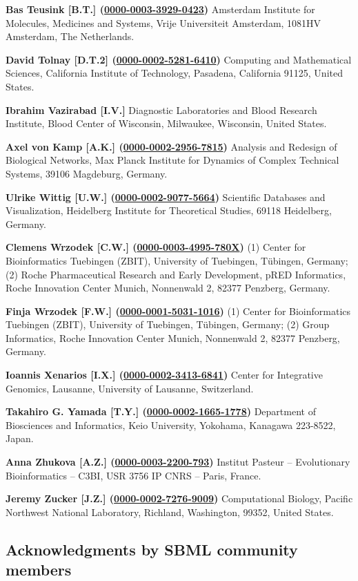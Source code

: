 \documentclass{sbml-paper}
\newcommand{\orcid}[1]{\href{https://orcid.org/#1}{#1}}
\begin{document}
\textbf{Bas Teusink [B.T.] (\orcid{0000-0003-3929-0423})} Amsterdam Institute for Molecules, Medicines and Systems, Vrije Universiteit Amsterdam, 1081HV Amsterdam, The Netherlands.

\textbf{David Tolnay [D.T.2] (\orcid{0000-0002-5281-6410})} Computing and Mathematical Sciences, California Institute of Technology, Pasadena, California 91125, United States.

\textbf{Ibrahim Vazirabad [I.V.]} Diagnostic Laboratories and Blood Research Institute, Blood Center of Wisconsin, Milwaukee, Wisconsin, United States.

\textbf{Axel von Kamp [A.K.] (\orcid{0000-0002-2956-7815})} Analysis and Redesign of Biological Networks, Max Planck Institute for Dynamics of Complex Technical Systems, 39106 Magdeburg, Germany.

\textbf{Ulrike Wittig [U.W.] (\orcid{0000-0002-9077-5664})} Scientific Databases and Visualization, Heidelberg Institute for Theoretical Studies, 69118 Heidelberg, Germany.

\textbf{Clemens Wrzodek [C.W.] (\orcid{0000-0003-4995-780X})} (1) Center for Bioinformatics Tuebingen (ZBIT), University of Tuebingen, Tübingen, Germany; (2) Roche Pharmaceutical Research and Early Development, pRED Informatics, Roche Innovation Center Munich, Nonnenwald 2, 82377 Penzberg, Germany.

\textbf{Finja Wrzodek [F.W.] (\orcid{0000-0001-5031-1016})} (1) Center for Bioinformatics Tuebingen (ZBIT), University of Tuebingen, Tübingen, Germany; (2) Group Informatics, Roche Innovation Center Munich, Nonnenwald 2, 82377 Penzberg, Germany.

\textbf{Ioannis Xenarios [I.X.] (\orcid{0000-0002-3413-6841})} Center for Integrative Genomics, Lausanne, University of Lausanne, Switzerland.

\textbf{Takahiro G. Yamada [T.Y.] (\orcid{0000-0002-1665-1778})} Department of Biosciences and Informatics, Keio University, Yokohama, Kanagawa 223-8522, Japan.

\textbf{Anna Zhukova [A.Z.] (\orcid{0000-0003-2200-793})} Institut Pasteur – Evolutionary Bioinformatics – C3BI, USR 3756 IP CNRS – Paris, France.

\textbf{Jeremy Zucker [J.Z.] (\orcid{0000-0002-7276-9009})} Computational Biology, Pacific Northwest National Laboratory, Richland, Washington, 99352, United States.


\clearpage
\subsection{Acknowledgments by SBML community members}
\end{document}
